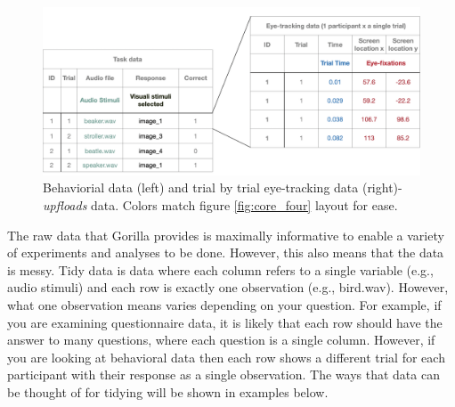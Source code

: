 \begin{figure}[ht]
    \centering
    \includegraphics[scale=.3]{figures/data_structure.png}
    \caption{Behaviorial data (left) and trial by trial eye-tracking data (right)-\textit{upfloads} data. Colors match figure \ref{fig:core_four} layout for ease.}
    \label{fig:data_structure}
\end{figure}

The raw data that Gorilla provides is maximally informative to enable a variety of experiments and analyses to be done. However, this also means that the data is messy. Tidy data is data where each column refers to a single variable (e.g., audio stimuli) and each row is exactly one observation (e.g., bird.wav). However, what one observation means varies depending on your question. For example, if you are examining questionnaire data, it is likely that each row should have the answer to many questions, where each question is a single column. However, if you are looking at behavioral data then each row shows a different trial for each participant with their response as a single observation. The ways that data can be thought of for tidying will be shown in examples below.


